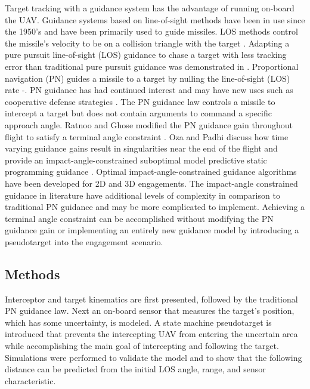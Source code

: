 \documentclass[conference]{IEEEtran}
\begin{document}
Target tracking with a guidance system has the advantage of running on-board the UAV.  Guidance systems based on line-of-sight methods have been in use since the 1950’s \cite{zarchan} and have been primarily used to guide missiles. LOS methods control the missile’s velocity to be on a collision triangle with the target \cite{shneydor1998missile,yanushevsky2007modern}. Adapting a pure pursuit line-of-sight (LOS) guidance to chase a target with less tracking error than traditional pure pursuit guidance was demonstrated in \cite{yamasaki_advanced_2009}.  Proportional navigation (PN) guides a missile to a target by nulling the line-of-sight (LOS) rate \cite{shneydor1998missile}-\cite{yanushevsky2007modern}. PN guidance has had continued interest and may have new uses such as cooperative defense strategies \cite{isaac}. The PN guidance law controls a missile to intercept a target but does not contain arguments to command a specific approach angle. Ratnoo and Ghose modified the PN guidance gain throughout flight to satisfy a terminal angle constraint \cite{ratnoo2009satisfying}. Oza and Padhi discuss how time varying guidance gains result in singularities near the end of the flight and provide an impact-angle-constrained suboptimal model predictive static programming guidance \cite{oza2012impact}. Optimal impact-angle-constrained guidance algorithms have been developed for 2D \cite{park2013optimal} and 3D \cite{kumar2014three} engagements. The impact-angle constrained guidance in literature have additional levels of complexity in comparison to traditional PN guidance and may be more complicated to implement. Achieving a terminal angle constraint can be accomplished without modifying the PN guidance gain or implementing an entirely new guidance model by introducing a pseudotarget into the engagement scenario.



\subsection{Methods}
Interceptor and target kinematics are first presented, followed by the traditional PN guidance law. Next an on-board sensor that measures the target's position, which has some uncertainty, is modeled. A state machine pseudotarget is introduced that prevents the intercepting UAV from entering the uncertain area while accomplishing the main goal of intercepting and following the target. Simulations were performed to validate the model and to show that the following distance can be predicted from the initial LOS angle, range, and sensor characteristic.
\end{document}
